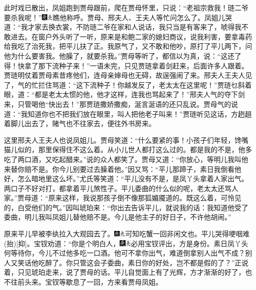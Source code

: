 此时戏已散出，凤姐跑到贾母跟前，爬在贾母怀里，只说：``老祖宗救我！琏二爷要杀我呢！''{\includegraphics[width=3mm]{../Images/00004}\includegraphics[width=3mm]{../Images/00012}\footnotesize \kaishu 瞧他称呼。}贾母、邢夫人、王夫人等忙问怎么了。凤姐儿哭道：``我才家去换衣裳，不防琏二爷在家和人说话，我只当是有客来了，唬得我不敢进去。在窗户外头听了一听，原来是和鲍二家的媳妇商议，说我利害，要拿毒药给我吃了治死我，把平儿扶了正。我原气了，又不敢和他吵，原打了平儿两下，问他为什么要害我。他臊了，就要杀我。''贾母等听了，都信以为真，说：``这还了得！快拿了那下流种子来！''一语未完，只见贾琏拿着剑赶来，后面许多人跟着。贾琏明仗着贾母素昔疼他们，连母亲婶母也无碍，故逞强闹了来。邢夫人王夫人见了，气的忙拦住骂道：``这下流种子！你越发反了，老太太在这里呢！''贾琏乜斜着眼，道：``都是老太太惯的他，他才这样，连我也骂起来了！''邢夫人气的夺下剑来，只管喝他``快出去！''那贾琏撒娇撒痴，涎言涎语的还只乱说。贾母气的说道：``我知道你也不把我们放在眼里，叫人把他老子叫来！''贾琏听见这话，方趔趄着脚儿出去了，赌气也不往家去，便往外书房来。

这里邢夫人王夫人也说凤姐儿。贾母笑道：``什么要紧的事！小孩子们年轻，馋嘴猫儿似的，那里保得住不这么着。从小儿世人都打这么过的。都是我的不是，他多吃了两口酒，又吃起醋来。''说的众人都笑了。贾母又道：``你放心，等明儿我叫他来替你赔不是。你今儿别要过去臊着他。''因又骂：``平儿那蹄子，素日我倒看他好，怎么暗地里这么坏。''尤氏等笑道：``平儿没有不是，是凤丫头拿着人家出气。两口子不好对打，都拿着平儿煞性子。平儿委曲的什么似的呢，老太太还骂人家。''贾母道：``原来这样，我说那孩子倒不像那狐媚魇道的。既这么着，可怜见的，白受他们的气。''因叫琥珀来：``你出去告诉平儿，就说我的话：我知道他受了委曲，明儿我叫凤姐儿替他赔不是。今儿是他主子的好日子，不许他胡闹。''

原来平儿早被李纨拉入大观园去了。{\includegraphics[width=3mm]{../Images/00004}\includegraphics[width=3mm]{../Images/00012}\footnotesize \kaishu 可知吃蟹一回非闲文也。}平儿哭得哽咽难{(抬)}{[}抑{]}。宝钗劝道：``你是个明白人，{\includegraphics[width=3mm]{../Images/00004}\includegraphics[width=3mm]{../Images/00012}\footnotesize \kaishu 必用宝钗评出，方是身份。}素日凤丫头何等待你，今儿不过他多吃一口酒。他可不拿你出气，难道倒拿别人出气不成？别人又笑话他吃醉了。你只管这会子委曲，素日你的好处，岂不都是假的了？''正说着，只见琥珀走来，说了贾母的话。平儿自觉面上有了光辉，方才渐渐的好了，也不往前头来。宝钗等歇息了一回，方来看贾母凤姐。

